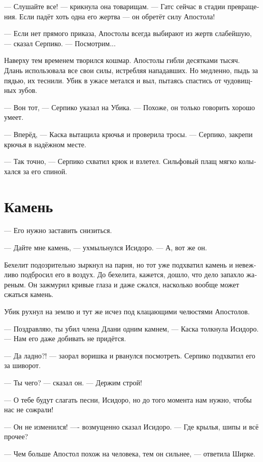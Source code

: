 \documentclass[a4paper,12pt,fleqn]{book}\usepackage{polyglossia}\setdefaultlanguage[babelshorthands=true]{russian}\setotherlanguage{english}\defaultfontfeatures{Ligatures=TeX,Mapping=tex-text}\usepackage{xcolor}\newcommand{\ml}[3]{#2}
\newcommand{\textspace}{\vspace{1em}{\centering\Large\bfseries<...>\par}\vspace{1em}}
\begin{document}
--- Слушайте все! --- крикнула она товарищам.
--- Гатс сейчас в стадии превращения.
Если падёт хоть одна его жертва --- он обретёт силу Апостола!

--- Если нет прямого приказа, Апостолы всегда выбирают из жертв слабейшую, --- сказал Серпико.
--- Посмотрим...

Наверху тем временем творился кошмар.
Апостолы гибли десятками тысяч.
Длань использовала все свои силы, истребляя нападавших.
Но медленно, пыдь за пядью, их теснили.
Убик в ужасе метался и выл, пытаясь спастись от чудовищных зубов.

--- Вон тот, --- Серпико указал на Убика.
--- Похоже, он только говорить хорошо умеет.

--- Вперёд, --- Каска вытащила крючья и проверила тросы.
--- Серпико, закрепи крючья в надёжном месте.

--- Так точно, --- Серпико схватил крюк и взлетел.
Сильфовый плащ мягко колыхался за его спиной.

\section{Камень}

--- Его нужно заставить снизиться.

--- Дайте мне камень, --- ухмыльнулся Исидоро.
--- А, вот же он.

Бехелит подозрительно зыркнул на парня, но тот уже подхватил камень и невежливо подбросил его в воздух.
До бехелита, кажется, дошло, что дело запахло жареным.
Он зажмурил кривые глаза и даже сжался, насколько вообще может сжаться камень.

\textspace

Убик рухнул на землю и тут же исчез под клацающими челюстями Апостолов.

--- Поздравляю, ты убил члена Длани одним камнем, --- Каска толкнула Исидоро.
--- Нам его даже добивать не придётся.

--- Да ладно?! --- заорал воришка и рванулся посмотреть.
Серпико подхватил его за шиворот.

--- Ты чего? --- сказал он.
--- Держим строй!

--- О тебе будут слагать песни, Исидоро, но до того момента нам нужно, чтобы нас не сожрали!

\textspace

--- Он не изменился! ---- возмущенно сказал Исидоро.
--- Где крылья, шипы и всё прочее?

--- Чем больше Апостол похож на человека, тем он сильнее, --- ответила Ширке.
\end{document}

